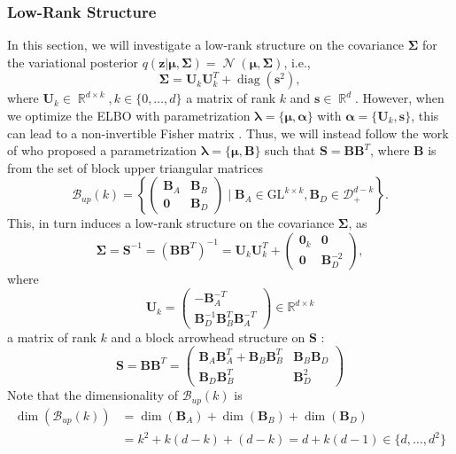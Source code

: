 \documentclass[a4paper, 11pt, oneside]{scrartcl}
\theoremstyle{break}
\DeclareMathOperator{\Normal}{\mathcal{N}}
\DeclareMathOperator{\Real}{\mathbb{R}}
\DeclareMathOperator{\diag}{diag}
\newcommand{\matr}[1]{\boldsymbol{#1}}
\newcommand{\set}[1]{\mathcal{#1}}
\numberwithin{equation}{section}
\begin{document}
			\subsubsection{Low-Rank Structure}
				In this section, we will investigate a low-rank structure on the covariance $\matr{\Sigma}$ for the variational posterior $q(\matr{z} | \matr{\mu}, \matr{\Sigma}) = \Normal(\matr{\mu}, \matr{\Sigma})$, i.e., 
					$$\matr{\Sigma} = \matr{U}_k \matr{U}_k^T + \diag(\matr{s}^2),$$ 
				where $\matr{U}_k \in \Real^{d \times k}, k \in \{0, \dots, d\}$ a matrix of rank $k$ and $\matr{s} \in \Real^d.$
				However, when we optimize the ELBO with parametrization $\matr{\lambda} = \{\matr{\mu}, \matr{\alpha}\}$ with $\matr{\alpha} = \{\matr{U}_k, \matr{s}\}$, this can lead to a non-invertible Fisher matrix \cite[Sec. J.1.6]{LNK+21}. 
				Thus, we will instead follow the work of \cite{LNK+21} who proposed a parametrization $\matr{\lambda} = \{\matr{\mu}, \matr{B}\}$ such that $\matr{S} = \matr{B} \matr{B}^T$, where $\matr{B}$ is from the set of block upper triangular matrices
					$$\set{B}_{up}(k) = \left\{\begin{pmatrix} \matr{B}_A & \matr{B}_B \\
														        \matr{0}  & \matr{B}_D
										  \end{pmatrix} \mid \matr{B}_A \in \text{GL}^{k \times k}, \matr{B}_D \in \set{D}_+^{d-k}\right\}.$$
				This, in turn induces a low-rank structure on the covariance $\matr{\Sigma}$, as 
				$$\matr{\Sigma} = \matr{S}^{-1} = (\matr{B} \matr{B}^T)^{-1} = \matr{U}_k \matr{U}_k^T + \begin{pmatrix} \matr{0}_k & \matr{0} \\ \matr{0} & \matr{B}_D^{-2}\end{pmatrix},$$
				where 
				$$\matr{U}_k = \begin{pmatrix} -\matr{B}_A^{-T} \\ \matr{B}_D^{-1} \matr{B}_B^T \matr{B}_A^{-T}\end{pmatrix} \in \mathbb{R}^{d \times k}$$
				a matrix of rank $k$ and a block arrowhead structure on $\matr{S}$ \cite{OS90}:
				$$\matr{S} = \matr{B} \matr{B}^T = \begin{pmatrix} \matr{B}_A \matr{B}_A^T + \matr{B}_B \matr{B}_B^T & \matr{B}_B \matr{B}_D \\ \matr{B}_D \matr{B}_B^T & \matr{B}_D^2 \end{pmatrix}$$
				Note that the dimensionality of $\set{B}_{up}(k)$ is
				\begin{align*}
					\dim(\set{B}_{up}(k)) &= \dim (\matr{B}_A) + \dim (\matr{B}_B) + \dim (\matr{B}_D) \\
					&= k^2 + k (d - k) + (d - k) = d + k (d - 1) \in \{d, \dots, d^2\}
				\end{align*}
\end{document}
